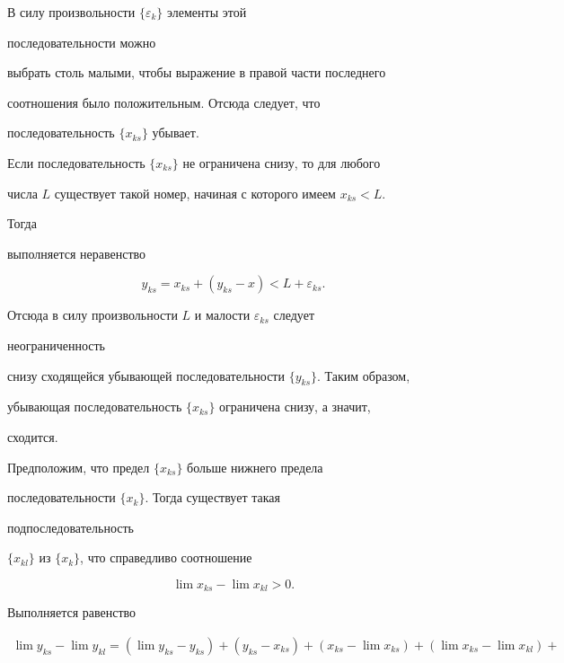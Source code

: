 \begin{pf}
В силу произвольности $\{\varepsilon_k\}$ элементы этой 


последовательности можно 


выбрать столь малыми, чтобы выражение в правой части последнего 


соотношения было положительным. Отсюда следует, что 


последовательность $\{x_{ks}\}$ убывает. 


 


Если последовательность $\{x_{ks}\}$ не ограничена снизу, то для любого 


числа $L$ существует такой номер, начиная с которого имеем $x_{ks}<L$. 


Тогда 


выполняется неравенство 


$$ 


y_{ks}=x_{ks}+(y_{ks}-x)<L+\varepsilon_{ks}. 


$$ 


Отсюда в силу произвольности $L$ и малости $\varepsilon_{ks}$ следует 


неограниченность 


снизу сходящейся убывающей последовательности $\{y_{ks}\}$. Таким образом, 


убывающая последовательность $\{x_{ks}\}$ ограничена снизу, а значит, 


сходится. 


 


Предположим, что предел $\{x_{ks}\}$ больше нижнего предела 


последовательности $\{x_k\}$. Тогда существует такая 


подпоследовательность 


$\{x_{kl}\}$ из $\{x_k\}$, что справедливо соотношение 


\begin{equation} 


\lim x_{ks}-\lim x_{kl}>0. 


\end{equation} 


Выполняется равенство 


\begin{multline*} 


\lim y_{ks}-\lim y_{kl}=(\lim y_{ks}-y_{ks})+ 


(y_{ks}-x_{ks})+(x_{ks}-\lim x_{ks})+(\lim x_{ks}-\lim x_{kl})+ \\ 



\end{multline*}
\end{pf}
